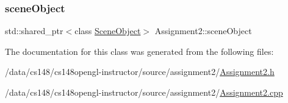\hypertarget{class_assignment2_a3afcc7cf71f0b1eb855482057beb1146}{}\label{class_assignment2_a3afcc7cf71f0b1eb855482057beb1146} 
\subsubsection{\texorpdfstring{scene\+Object}{sceneObject}}
{\footnotesize\ttfamily std\+::shared\+\_\+ptr$<$class \hyperlink{class_scene_object}{Scene\+Object}$>$ Assignment2\+::scene\+Object\hspace{0.3cm}{\ttfamily [private]}}



The documentation for this class was generated from the following files\+:\begin{DoxyCompactItemize}
\item 
/data/cs148/cs148opengl-\/instructor/source/assignment2/\hyperlink{_assignment2_8h}{Assignment2.\+h}\item 
/data/cs148/cs148opengl-\/instructor/source/assignment2/\hyperlink{_assignment2_8cpp}{Assignment2.\+cpp}\end{DoxyCompactItemize}
